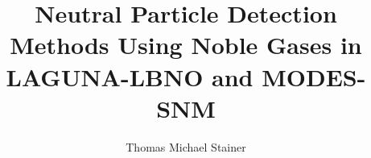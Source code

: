 \documentclass[a4paper,11pt,default,numbered,print,index]{Classes/PhDThesisPSnPDF}
\title{Neutral Particle Detection Methods Using Noble Gases in LAGUNA-LBNO and MODES-SNM}
\author{Thomas Michael Stainer}
\begin{document}
\frontmatter

\begin{titlepage}
	\maketitle
\end{titlepage}

\setcounter{secnumdepth}{3}
\setcounter{tocdepth}{3}

%






\tableofcontents


\printnomencl

\mainmatter
{}
 











\backmatter 

\begin{spacing}{0.9}

%
%

\renewcommand{\bibname}{References} %

\end{spacing}

\printthesisindex %

\printthesisindex
\end{document}
